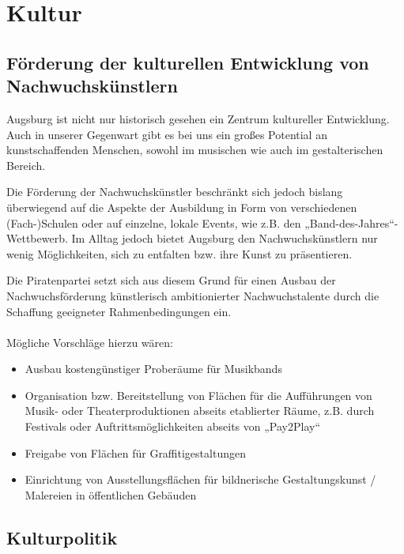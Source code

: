 \chapter{Kultur}
  
  \section{Förderung der kulturellen Entwicklung von Nachwuchskünstlern}
  Augsburg ist nicht nur historisch gesehen ein Zentrum kultureller 
  Entwicklung. Auch in unserer Gegenwart gibt es bei uns ein großes Potential 
  an kunstschaffenden Menschen, sowohl im musischen wie auch im 
  gestalterischen Bereich.
  
  Die Förderung der Nachwuchskünstler beschränkt sich jedoch bislang 
  überwiegend auf die Aspekte der Ausbildung in Form von verschiedenen 
  (Fach-)Schulen oder auf einzelne, lokale Events, wie z.B. den 
  „Band-des-Jahres“-Wettbewerb. Im Alltag jedoch bietet Augsburg den 
  Nachwuchskünstlern nur wenig Möglichkeiten, sich zu entfalten bzw. ihre 
  Kunst zu präsentieren.
  
  Die Piratenpartei setzt sich aus diesem Grund für einen Ausbau der 
  Nachwuchsförderung künstlerisch ambitionierter Nachwuchstalente durch die 
  Schaffung geeigneter Rahmenbedingungen ein.\\
  \\
  Mögliche Vorschläge hierzu wären:
  
  \begin{itemize}
    \item Ausbau kostengünstiger Proberäume für Musikbands
    \item Organisation bzw. Bereitstellung von Flächen für die Aufführungen
          von Musik- oder Theaterproduktionen abseits etablierter Räume, z.B. 
          durch Festivals oder Auftrittsmöglichkeiten abseits von „Pay2Play“
    \item Freigabe von Flächen für Graffitigestaltungen
    \item Einrichtung von Ausstellungsflächen für bildnerische 
          Gestaltungskunst / Malereien in öffentlichen Gebäuden 
  \end{itemize}
  
  \section{Kulturpolitik}
